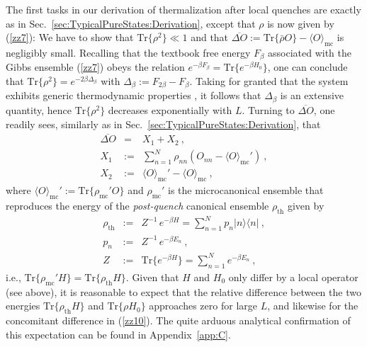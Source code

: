 \documentclass[twocolumn,aps,prb,floatfix,superscriptaddress]{revtex4-2}
\newcommand{\ket}[1]{\lvert #1 \rangle} 	%
\newcommand{\bra}[1]{\langle #1 \rvert}	%
\newcommand{\<}{\left\langle}	%
\renewcommand{\>}{\right\rangle}	%
\newcommand{\tr}{\mbox{Tr}}
\newcommand{\Omc}{\langle O\rangle_{\!\mathrm{mc}}}
\newcommand{\rhomic}{\rho_{\mathrm{mc}}}
\newcommand{\rhoth}{\rho_{\mathrm{th}}}
\begin{document}
The first
tasks
in our derivation of
thermalization after local quenches
are 
exactly as in Sec.~\ref{sec:TypicalPureStates:Derivation}, except that 
$\rho$ is now given by (\ref{zz7}):
We have to show that $\tr\{\rho^2\}\ll 1$ and that
$\overline{\Delta O} := \tr\{\bar\rho O\} - \Omc$
is negligibly small.
Recalling that the textbook free energy $F_\beta$
associated with the Gibbs ensemble (\ref{zz7}) 
obeys the relation $e^{-\beta F_\beta}=\tr\{e^{-\beta H_0}\}$,
one can conclude that $\tr\{\rho^2\}=e^{-2\beta \Delta_\beta}$
with $\Delta_\beta:=F_{2\beta}-F_{\beta}$.
Taking for granted that the system exhibits 
generic thermodynamic properties \cite{tas16}, 
it follows that $\Delta_\beta$ is an extensive quantity, 
hence $\tr\{\rho^2\}$ decreases exponentially 
with $L$.
Turning to $\overline{\Delta O}$, one readily sees, 
similarly as in Sec.~\ref{sec:TypicalPureStates:Derivation}, that
\begin{eqnarray}
\overline{\Delta O} & = & X_1+X_2
\ ,
\label{zz8}
\\
X_1 & := &  \sum_{n=1}^N \rho_{nn} (O_{nn}-\Omc')
\ ,
\label{zz9}
\\
X_2 & := & \Omc'-\Omc \ ,
\label{zz10}
\end{eqnarray}
where $\Omc' := \tr\{ \rhomic' O \}$ and $\rhomic'$ is the microcanonical 
ensemble that reproduces the energy of the 
\emph{post-quench} canonical ensemble $\rhoth$ given by
\begin{eqnarray}
	\rhoth &:= & Z^{-1} \, e^{-\beta H} = \sum_{n=1}^N p_n \ket{n} \bra{n} \ ,
	\label{zz11}
	\\
	p_n &:= & Z^{-1} \, e^{-\beta E_n} \ ,
	\label{zz12}
	\\
	Z &:= & \tr\{ e^{-\beta H} \} =  \sum_{n=1}^N e^{-\beta E_n} \ ,
	\label{zz13}
\end{eqnarray}
i.e., $\tr\{\rhomic' H\} = \tr\{ \rhoth H \}$.
Given that $H$ and $H_0$ only differ by a local operator (see above),
it is reasonable to expect that the relative difference between the 
two energies $\tr\{ \rhoth H \}$ and  $\tr\{ \rho H_0 \}$ approaches zero
for large $L$, and likewise for the concomitant difference in (\ref{zz10}).
The quite arduous analytical confirmation of this expectation can be found 
in
Appendix~\ref{app:C}.
\end{document}
